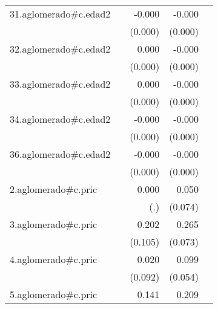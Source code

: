 {\begin{longtable}{l*{4}{D{.}{.}{-1}}}
\addlinespace
31.aglomerado#c.edad2&                     &      -0.000         &      -0.000\sym{***}&                     \\
            &                     &     (0.000)         &     (0.000)         &                     \\
\addlinespace
32.aglomerado#c.edad2&                     &       0.000         &      -0.000\sym{*}  &                     \\
            &                     &     (0.000)         &     (0.000)         &                     \\
\addlinespace
33.aglomerado#c.edad2&                     &       0.000         &      -0.000\sym{**} &                     \\
            &                     &     (0.000)         &     (0.000)         &                     \\
\addlinespace
34.aglomerado#c.edad2&                     &      -0.000         &      -0.000\sym{**} &                     \\
            &                     &     (0.000)         &     (0.000)         &                     \\
\addlinespace
36.aglomerado#c.edad2&                     &      -0.000         &      -0.000\sym{*}  &                     \\
            &                     &     (0.000)         &     (0.000)         &                     \\
\addlinespace
2.aglomerado#c.pric&                     &       0.000         &       0.050         &                     \\
            &                     &         (.)         &     (0.074)         &                     \\
\addlinespace
3.aglomerado#c.pric&                     &       0.202         &       0.265\sym{***}&                     \\
            &                     &     (0.105)         &     (0.073)         &                     \\
\addlinespace
4.aglomerado#c.pric&                     &       0.020         &       0.099         &                     \\
            &                     &     (0.092)         &     (0.054)         &                     \\
\addlinespace
5.aglomerado#c.pric&                     &       0.141         &       0.209\sym{**} &                     \\

\end{longtable}}
